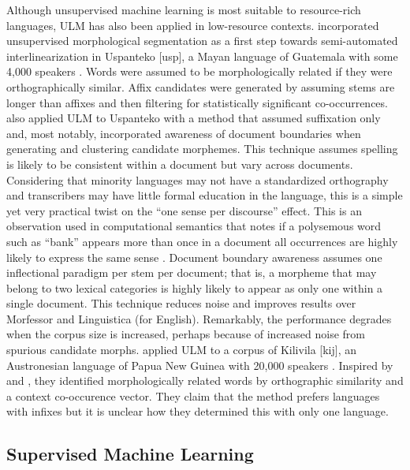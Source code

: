 \documentclass[12pt]{article}
\begin{document}
Although unsupervised machine learning is most suitable to resource-rich languages, ULM has also been applied in low-resource contexts.  incorporated unsupervised morphological segmentation as a first step towards semi-automated interlinearization in Uspanteko [usp], a Mayan language of Guatemala with some 4,000 speakers \cite{simons_ethnologue:_2018}. Words were assumed to be morphologically related if they were orthographically similar. Affix candidates were generated by assuming stems are longer than affixes and then filtering for statistically significant co-occurrences.  also applied ULM to Uspanteko with a method that assumed suffixation only and, most notably, incorporated awareness of document boundaries when generating and clustering candidate morphemes. This technique assumes spelling is likely to be consistent within a document but vary across documents. Considering that minority languages may not have a standardized orthography and transcribers may have little formal education in the language, this is a simple yet very practical twist on the “one sense per discourse” effect. This is an observation used in computational semantics that notes if a polysemous word such as ``bank'' appears more than once in a document all occurrences are highly likely to express the same sense \cite{gale_one_1992}. Document boundary awareness assumes one inflectional paradigm per stem per document; that is, a morpheme that may belong to two lexical categories is highly likely to appear as only one within a single document. This technique reduces noise and improves results over Morfessor and Linguistica (for English). Remarkably, the performance degrades when the corpus size is increased, perhaps because of increased noise from spurious candidate morphs.  applied ULM to a corpus of Kilivila [kij], an Austronesian language of Papua New Guinea with 20,000 speakers \cite{eberhard_ethnologue:2020}. Inspired by  and , they identified morphologically related words by orthographic similarity and a context co-occurence vector. They claim that the method prefers languages with infixes but it is unclear how they determined this with only one language. 

\subsection{Supervised Machine Learning}
\label{sec:supervised}
\end{document}

